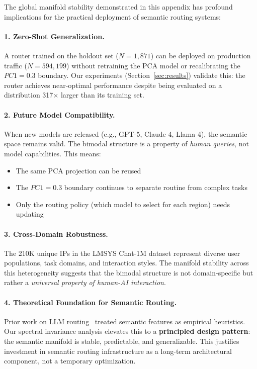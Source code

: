 The global manifold stability demonstrated in this appendix has profound implications for the practical deployment of semantic routing systems:

\paragraph{1. Zero-Shot Generalization.}
A router trained on the holdout set ($N=1,871$) can be deployed on production traffic ($N=594,199$) without retraining the PCA model or recalibrating the $PC1=0.3$ boundary. Our experiments (Section~\ref{sec:results}) validate this: the router achieves near-optimal performance despite being evaluated on a distribution 317$\times$ larger than its training set.

\paragraph{2. Future Model Compatibility.}
When new models are released (e.g., GPT-5, Claude 4, Llama 4), the semantic space remains valid. The bimodal structure is a property of \emph{human queries}, not model capabilities. This means:
\begin{itemize}[leftmargin=*,noitemsep,topsep=0pt]
    \item The same PCA projection can be reused
    \item The $PC1=0.3$ boundary continues to separate routine from complex tasks
    \item Only the routing policy (which model to select for each region) needs updating
\end{itemize}

\paragraph{3. Cross-Domain Robustness.}
The 210K unique IPs in the LMSYS Chat-1M dataset represent diverse user populations, task domains, and interaction styles. The manifold stability across this heterogeneity suggests that the bimodal structure is not domain-specific but rather a \emph{universal property of human-AI interaction}.

\paragraph{4. Theoretical Foundation for Semantic Routing.}
Prior work on LLM routing~\cite{ong2024routellm,lu2024routing} treated semantic features as empirical heuristics. Our spectral invariance analysis elevates this to a \textbf{principled design pattern}: the semantic manifold is stable, predictable, and generalizable. This justifies investment in semantic routing infrastructure as a long-term architectural component, not a temporary optimization.

